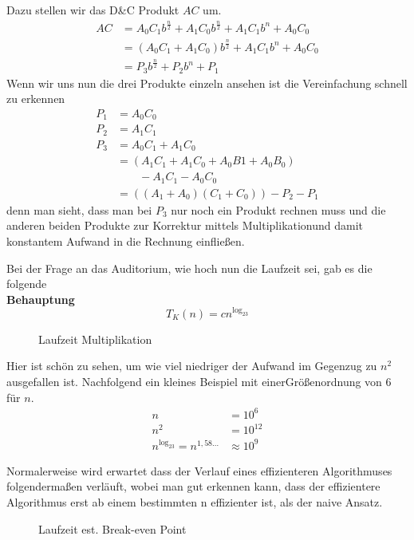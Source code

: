 \documentclass[a4paper,twoside,10pt]{report}
\begin{document}
Dazu stellen wir das D\&C Produkt $AC$ um.
\begin{align*}
AC&=A_0C_1b^{\frac{n}{2}}+A_1C_0b^{\frac{n}{2}}+A_1C_1b^n+A_0C_0\\
&=\left(A_0C_1+A_1C_0\right)b^{\frac{n}{2}}+A_1C_1b^n+A_0C_0\\
&=P_3b^{\frac{n}{2}}+P_2b^n+P_1
\end{align*}
Wenn wir uns nun die drei Produkte einzeln ansehen ist die Vereinfachung schnell zu erkennen
\begin{align*}
P_1&=A_0C_0\\
P_2&=A_1C_1\\
P_3&=A_0C_1+A_1C_0\\
&=(A_1C_1+A_1C_0+A_0B1+A_0B_0)\\
&\qquad {}-A_1C_1-A_0C_0\\
&=\left((A_1+A_0)(C_1+C_0)\right)-P_2-P_1
\end{align*}
denn man sieht, dass man bei $P_3$ nur noch ein Produkt rechnen muss und die anderen beiden Produkte zur Korrektur mittels Multiplikation\linebreak und damit konstantem Aufwand in die Rechnung einfließen.

Bei der Frage an das Auditorium, wie hoch nun die Laufzeit sei, gab es die folgende\\[.5em]
\textbf{Behauptung}
$$T_K(n)=cn^{\log_23}$$
\begin{figure}[h]
\caption{Laufzeit Multiplikation}
\end{figure}
Hier ist schön zu sehen, um wie viel niedriger der Aufwand im Gegenzug zu $n^2$ ausgefallen ist. Nachfolgend ein kleines Beispiel mit einer\linebreak Größenordnung von 6 für $n$.
\begin{align*}
n&=10^6\\
n^2&=10^{12}\\
n^{\log_23}=n^{1,58\ldots}&\approx10^{9}
\end{align*}

Normalerweise wird erwartet dass der Verlauf eines effizienteren Algorithmuses folgendermaßen verläuft, wobei man gut erkennen kann, dass der effizientere Algorithmus erst ab einem bestimmten n effizienter ist, als der naive Ansatz.
\begin{figure}[H]
\caption{Laufzeit est. Break-even Point}
\end{figure}
\end{document}
